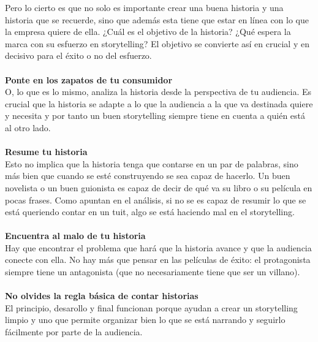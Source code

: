\documentclass[twoside,twocolumn]{article}
\begin{document}
Pero lo cierto es que no solo es importante crear una buena historia y una historia que se recuerde, sino que además esta tiene que estar en línea con lo que la empresa quiere de ella. ¿Cuál es el objetivo de la historia? ¿Qué espera la marca con su esfuerzo en storytelling? El objetivo se convierte así en crucial y en decisivo para el éxito o no del esfuerzo.
\\\\
\textbf{Ponte en los zapatos de tu consumidor}
\\O, lo que es lo mismo, analiza la historia desde la perspectiva de tu audiencia. Es crucial que la historia se adapte a lo que la audiencia a la que va destinada quiere y necesita y por tanto un buen storytelling siempre tiene en cuenta a quién está al otro lado.
\\\\
\textbf{Resume tu historia}
\\Esto no implica que la historia tenga que contarse en un par de palabras, sino más bien que cuando se esté construyendo se sea capaz de hacerlo. Un buen novelista o un buen guionista es capaz de decir de qué va su libro o su película en pocas frases. Como apuntan en el análisis, si no se es capaz de resumir lo que se está queriendo contar en un tuit, algo se está haciendo mal en el storytelling.
\\\\
\textbf{Encuentra al malo de tu historia}
\\Hay que encontrar el problema que hará que la historia avance y que la audiencia conecte con ella. No hay más que pensar en las películas de éxito: el protagonista siempre tiene un antagonista (que no necesariamente tiene que ser un villano).
\\\\
\textbf{No olvides la regla básica de contar historias}
\\El principio, desarollo y final funcionan porque ayudan a crear un storytelling limpio y uno que permite organizar bien lo que se está narrando y seguirlo fácilmente por parte de la audiencia.
\\\\
\end{document}
